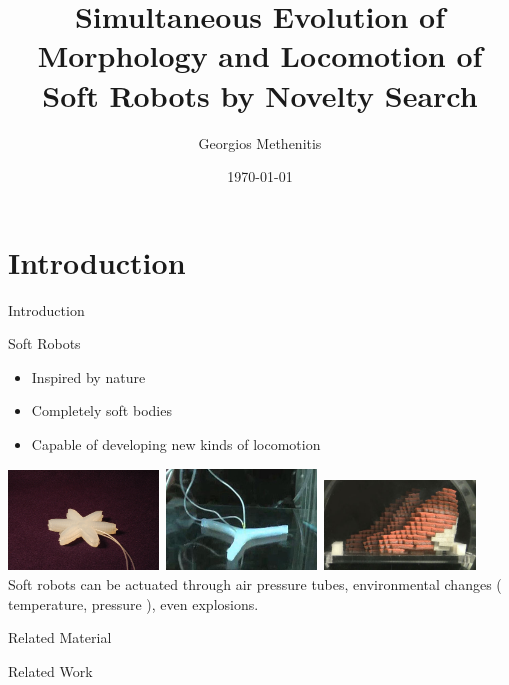 \documentclass{beamer}
\title[Simultaneous Evolution of Morphology and Locomotion of Soft Robots by Novelty Search]{Simultaneous Evolution of Morphology and Locomotion of Soft Robots by Novelty Search}
\author{Georgios Methenitis}
\institute{University of Amsterdam}
\date{\today}
\begin{document}
\begin{frame}
  \titlepage
\end{frame}


\section{Introduction}
\begin{frame}{Introduction}
\begin{block}{Soft Robots}
\begin{itemize}
\item Inspired by nature
\item Completely soft bodies
\item Capable of developing new kinds of locomotion
\end{itemize}
\end{block}
\includegraphics[width=0.3\textwidth,height=0.25\textheight]{figures/soft_robotics_figure.png}\	
\includegraphics[width=0.3\textwidth,height=0.25\textheight]{figures/ExplodingRobot.jpg}\	
\includegraphics[width=0.3\textwidth,height=0.25\textheight]{figures/hillerPressureChamber.png}\\
\vspace{0.3cm}
Soft robots can be actuated through air pressure tubes, environmental changes ( temperature, pressure ), even explosions.
\end{frame}

\begin{frame}{Related Material}
\end{frame}

\begin{frame}{Related Work}
\end{frame}
\end{document}
